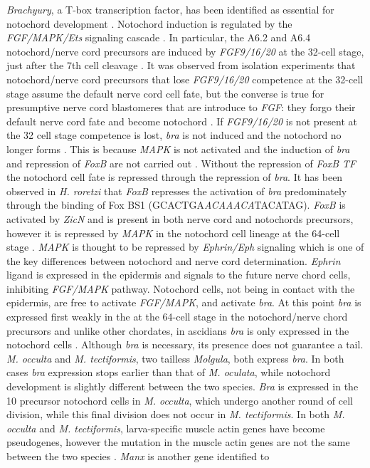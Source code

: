 \textit{Brachyury}, a T-box transcription factor, has been identified as essential for notochord development \cite{yasuo_conservation_1998}. Notochord induction is regulated by the \textit{FGF/MAPK/Ets} signaling cascade \cite{minokawa_binary_2001}. In particular, the A6.2 and A6.4 notochord/nerve cord precursors are induced by \textit{FGF9/16/20} at the 32-cell stage, just after the 7th cell cleavage \cite{satoh_ascidian_2001}. It was observed from isolation experiments that notochord/nerve cord precursors that lose \textit{FGF9/16/20} competence at the 32-cell stage assume the default nerve cord cell fate, but the converse is true for presumptive nerve cord blastomeres that are introduce to \textit{FGF}: they forgo their default nerve cord fate and become notochord \cite{yasuo_conservation_1998,minokawa_binary_2001}. If \textit{FGF9/16/20} is not present at the 32 cell stage competence is lost, \textit{bra} is not induced and the notochord no longer forms \cite{nakatani_basic_1996,nakatani_duration_1999}. This is because \textit{MAPK} is not activated and the induction of \textit{bra} and repression of \textit{FoxB} are not carried out \cite{hashimoto_transcription_2011}. Without the repression of \textit{FoxB TF} the notochord cell fate is repressed through the repression of \textit{bra}. It has been observed in \textit{H. roretzi} that \textit{FoxB} represses the activation of \textit{bra} predominately through the binding of Fox BS1 (GCACTGA\textit{ACAAACA}TACATAG). \textit{FoxB} is activated by \textit{ZicN} and is present in both nerve cord and notochords precursors, however it is repressed by \textit{MAPK} in the notochord cell lineage at the 64-cell stage \cite{hashimoto_transcription_2011}. \textit{MAPK} is thought to be repressed by \textit{Ephrin/Eph} signaling which is one of the key differences between notochord and nerve cord determination. \textit{Ephrin} ligand is expressed in the epidermis and signals to the future nerve chord cells, inhibiting \textit{FGF/MAPK} pathway. Notochord cells, not being in contact with the epidermis, are free to activate \textit{FGF/MAPK}, and activate \textit{bra}. At this point \textit{bra} is expressed first weakly in the at the 64-cell stage in the notochord/nerve chord precursors \cite{yasuo_ascidian_1994} and unlike other chordates, in ascidians \textit{bra} is only expressed in the notochord cells \cite{yasuo_function_1993,corbo_characterization_1997,hotta_temporal_1999,takada_brachyury_2002}. Although \textit{bra} is necessary, its presence does not guarantee a tail. \textit{M. occulta} and \textit{M. tectiformis}, two tailless \textit{Molgula}, both express \textit{bra}. In both cases \textit{bra} expression stops earlier than that of \textit{M. oculata}, while notochord development is slightly different between the two species. \textit{Bra} is expressed in the 10 precursor notochord cells in \textit{M. occulta}, which undergo another round of cell division, while this final division does not occur in \textit{M. tectiformis}.  In  both \textit{M. occulta} and \textit{M. tectiformis}, larva-specific muscle actin genes have become pseudogenes, however the mutation in the muscle actin genes are not the same between the two species  \cite{swalla_novel_1993,jeffery_evolution_1999}. \textit{Manx} is another gene identified to 